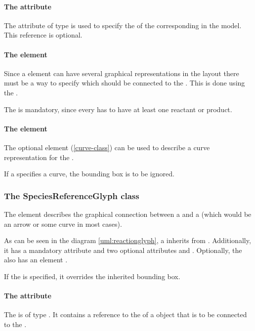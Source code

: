 \paragraph{The  attribute}
The  attribute of type  is used to 
specify the  of the corresponding \Reaction in the model. This 
reference is optional. 


\paragraph {The  element}
\label{listofspeciesreferenceglyphs-class}
Since a \Species element can have several graphical representations in 
the layout there must be a way to specify which \SpeciesGlyph should be 
connected to the \ReactionGlyph. This is done using the 
. 

The \ListOfSpeciesReferenceGlyphs is mandatory, since every \Reaction 
has to have at least one reactant or product. 


\paragraph {The  element}
The optional \Curve element (\ref{curve-class}) can be used to describe 
a curve representation for the \ReactionGlyph. 

If a \ReactionGlyph specifies a curve, the bounding box is to be 
ignored. 


\subsubsection{The SpeciesReferenceGlyph class}
\label{speciesreferenceglyph-class}
The  element describes the graphical 
connection between a \SpeciesGlyph and a \ReactionGlyph (which would be 
an arrow or some curve in most cases). 

As can be seen in the diagram \ref{uml:reactionglyph}, a 
\SpeciesReferenceGlyph inherits from \GraphicalObject. Additionally, it 
has a mandatory attribute  and two optional 
attributes  and . Optionally, the 
\SpeciesReferenceGlyph also has an element . 

If the  is specified, it overrides the inherited bounding box.


\paragraph{The  attribute}
The  is of type . It contains a 
reference to the  of a \SpeciesGlyph object that is to be 
connected to the \ReactionGlyph. 

